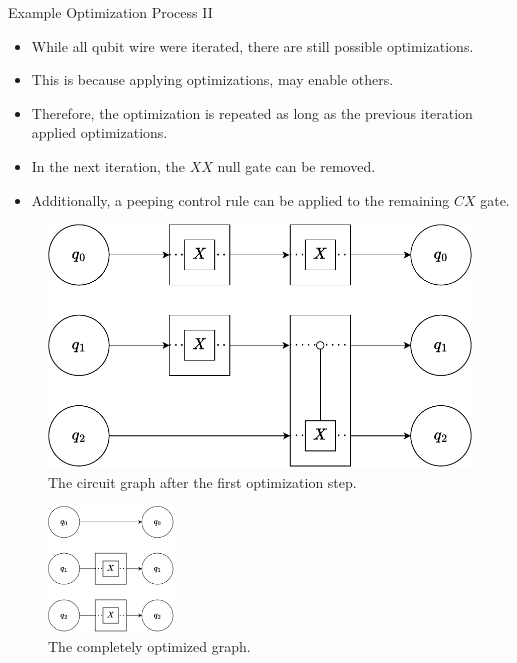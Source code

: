 \begin{frame}{Example Optimization Process II}
    \begin{itemize}
        \item While all qubit wire were iterated, there are still possible optimizations.
        \item This is because applying optimizations, may enable others.
        \item Therefore, the optimization is repeated as long as the previous iteration applied optimizations.
        \item In the next iteration, the $XX$ null gate can be removed.
        \item Additionally, a peeping control rule can be applied to the remaining $CX$ gate.
    \end{itemize}
    \vfill
    \hfill
    \begin{minipage}{.40\textwidth}
        \begin{figure}[htp]
            \centering     
            \includegraphics[width=\textwidth]{../figures/drawio/circuit_graph_optimized_firststep.pdf}
            \caption{The circuit graph after the first optimization step.}
        \end{figure}
    \end{minipage}
    \hfill
    \begin{minipage}{.30\textwidth}
        \begin{figure}[htp]
            \centering     
            \includegraphics[width=9em]{../figures/drawio/circuit_graph_optimized_complete.pdf}
            \caption{The completely optimized graph.}
        \end{figure}
    \end{minipage}
    \hfill
\end{frame}
